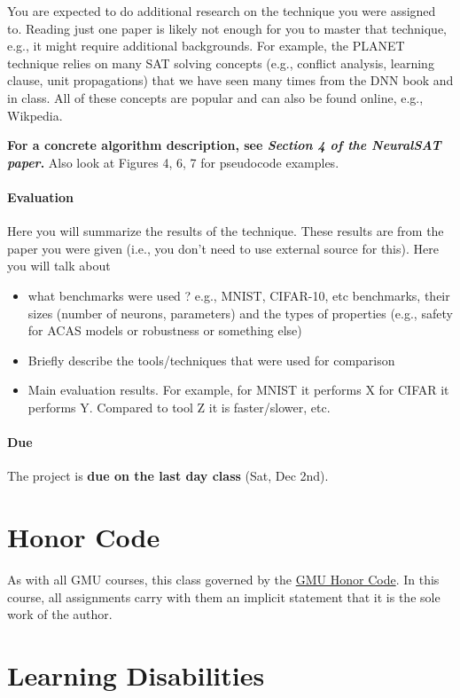 \documentclass[11pt]{article}
\begin{document}
You are expected to do additional research on the technique you were assigned to. Reading just one paper is likely not enough for you to master that technique, e.g., it might require additional backgrounds.  For example, the PLANET technique relies on many SAT solving concepts (e.g., conflict analysis, learning clause, unit propagations) that we have seen many times from the DNN book and in class.  All of these concepts are popular and can also be found online, e.g., Wikpedia. 

\textbf{For a concrete algorithm description, see \emph{Section 4 of the NeuralSAT paper}.} Also look at Figures 4, 6, 7 for pseudocode examples.

\paragraph{Evaluation} Here you will summarize the results of the technique. These results are from the paper you were given (i.e., you don't need to use external source for this). Here you will talk about
\begin{itemize}
    \item what benchmarks were used ?  e.g.,  MNIST, CIFAR-10, etc benchmarks, their sizes (number of neurons, parameters)  and the types of properties (e.g., safety for ACAS models or robustness or something else)
    \item Briefly describe the tools/techniques that were used for comparison
    \item Main evaluation results.  For example, for MNIST it performs X for CIFAR it performs Y.  Compared to tool Z it is faster/slower, etc.
\end{itemize}


\paragraph{Due} The project is \textbf{due on the last day class} (Sat, Dec 2nd).

\section{Honor Code}
\label{sec:orgf24f4c5}

As with all GMU courses, this class governed by the \href{http://oai.gmu.edu/the-mason-honor-code/}{GMU Honor Code}. In this course, all assignments carry with them an implicit statement that it is the sole work of the author.

\section{Learning Disabilities}
\label{sec:org28deb33}
\end{document}
